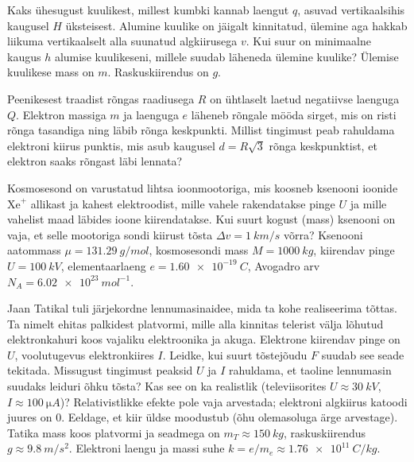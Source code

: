 \documentclass[10pt]{article}
\begin{document}
{
Kaks ühesugust kuulikest, millest kumbki kannab laengut $q$, asuvad vertikaalsihis kaugusel $H$ üksteisest. Alumine kuulike on jäigalt kinnitatud, ülemine aga hakkab liikuma vertikaalselt alla suunatud algkiirusega $v$. Kui suur on minimaalne kaugus $h$ alumise kuulikeseni, millele suudab läheneda ülemine kuulike? Ülemise kuulikese mass on $m$. Raskuskiirendus on $g$.
\probend
\bigskip


Peenikesest traadist rõngas raadiusega $R$ on ühtlaselt laetud negatiivse laenguga $Q$. Elektron massiga $m$ ja laenguga $e$ läheneb rõngale mööda sirget, mis on risti rõnga tasandiga ning läbib rõnga keskpunkti. Millist tingimust peab rahuldama elektroni kiirus punktis, mis asub kaugusel $d = R\sqrt 3$ rõnga keskpunktist, et elektron saaks rõngast läbi lennata?
\probend
\bigskip


Kosmosesond on varustatud lihtsa ioonmootoriga, mis koosneb ksenooni
ioonide $\mathrm{Xe}^+$ allikast ja kahest elektroodist, mille vahele rakendatakse pinge
$U$ ja mille vahelist maad läbides ioone kiirendatakse. Kui suurt kogust
(mass) ksenooni on vaja, et selle mootoriga sondi kiirust tõsta
$\Delta v=\SI{1}{km/s}$ võrra?
%
Ksenooni aatommass $\mu=\SI{131,29}{g/mol}$, kosmosesondi mass $M=\SI{1000}{kg}$, kiirendav pinge
$U=\SI{100}{kV}$, elementaarlaeng $e=\SI{1,60 e-19}{C}$, Avogadro arv
$N_A= \SI{6,02 e23}{mol^{-1}}$.
\probend
\bigskip


Jaan Tatikal tuli järjekordne lennumasinaidee, mida ta kohe realiseerima tõttas. Ta nimelt ehitas palkidest platvormi, mille alla kinnitas telerist välja lõhutud elektronkahuri koos vajaliku elektroonika ja akuga. Elektrone kiirendav pinge on $U$, voolutugevus elektronkiires $I$. Leidke, kui suurt tõstejõudu $F$ suudab see seade tekitada. Missugust tingimust peaksid $U$ ja $I$ rahuldama, et taoline lennumasin suudaks leiduri õhku tõsta? Kas see on ka realistlik (televiisorites $U \approx \SI{30}{kV}$, $I \approx \SI{100}{\micro A}$)? Relativistlikke efekte pole vaja arvestada; elektroni algkiirus katoodi juures on 0. Eeldage, et kiir üldse moodustub (õhu olemasoluga ärge arvestage). Tatika mass koos platvormi ja seadmega on $m_T \approx \SI{150}{kg}$, raskuskiirendus $g \approx \SI{9,8}{m/s^2}$. Elektroni laengu ja massi suhe $k = e/m_e \approx \SI{1,76e11}{C/kg}$.
\probend
\bigskip

}
\end{document}
